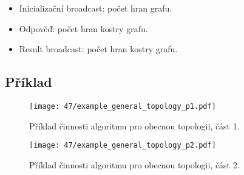 \begin{itemize}
    \item Inicializační broadcast: počet hran grafu.
    \item Odpověď: počet hran kostry grafu.
    \item Result broadcast: počet hran kostry grafu.
\end{itemize}

\subsection*{Příklad}

\begin{figure}[H]
    \centering
    \texttt{[image: 47/example\_general\_topology\_p1.pdf]}
    \caption{Příklad činnosti algoritmu pro obecnou topologii, část 1.}
\end{figure}

\begin{figure}[H]
    \centering
    \texttt{[image: 47/example\_general\_topology\_p2.pdf]}
    \caption{Příklad činnosti algoritmu pro obecnou topologii, část 2.}
\end{figure}
